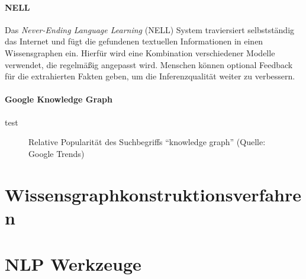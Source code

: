 \paragraph{NELL}
Das \textit{Never-Ending Language Learning} (NELL) System traviersiert selbstständig das Internet und fügt die gefundenen textuellen Informationen in einen Wissensgraphen ein.
Hierfür wird eine Kombination verschiedener Modelle verwendet, die regelmäßig angepasst wird.
Menschen können optional Feedback für die extrahierten Fakten geben, um die Inferenzqualität weiter zu verbessern.

\paragraph{Google Knowledge Graph}
test

\begin{figure}
	\caption{Relative Popularität des Suchbegriffs ``knowledge graph'' (Quelle: Google Trends)}\label{fig:related:kgTrend}
\end{figure}

\section{Wissensgraphkonstruktionsverfahren}
\label{sec:related:kbc}

\section{NLP Werkzeuge}
\label{sec:related:nlp}
